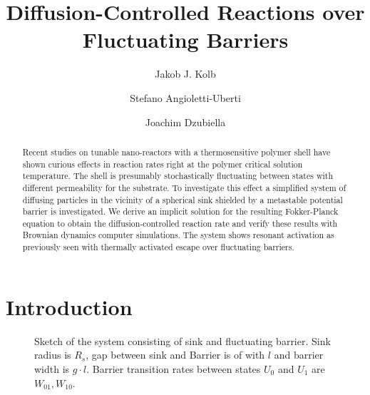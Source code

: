 \documentclass[twocolumn,superscriptaddress]{revtex4}
\begin{document}
 

\title{Diffusion-Controlled Reactions over Fluctuating Barriers} 

\author{Jakob J. Kolb}
\author{Stefano Angioletti-Uberti}
\author{Joachim Dzubiella}



\begin{abstract}
Recent studies on tunable nano-reactors with a thermosensitive polymer shell have shown curious effects in reaction rates
right at the polymer critical solution temperature.
The shell is presumably stochastically fluctuating between states with different permeability for the substrate.
To investigate this effect a simplified system of diffusing particles in the vicinity of a spherical sink shielded by a metastable potential barrier is investigated. We derive an implicit solution for the resulting Fokker-Planck equation to obtain the diffusion-controlled reaction rate and verify these results with Brownian dynamics computer simulations. The system shows resonant activation as previously seen with thermally activated escape over fluctuating barriers.


\end{abstract}

\maketitle

\section{Introduction}


\begin{figure}[H]
    
    \caption{Sketch of the system consisting of sink and fluctuating barrier. Sink radius is $R_s$, gap between sink and Barrier is of with $l$ and barrier width is $g\cdot l$. Barrier transition rates between states $U_0$ and $U_1$ are $W_{01}, W_{10}$.}
\label{fig0}
\end{figure}
\end{document}
